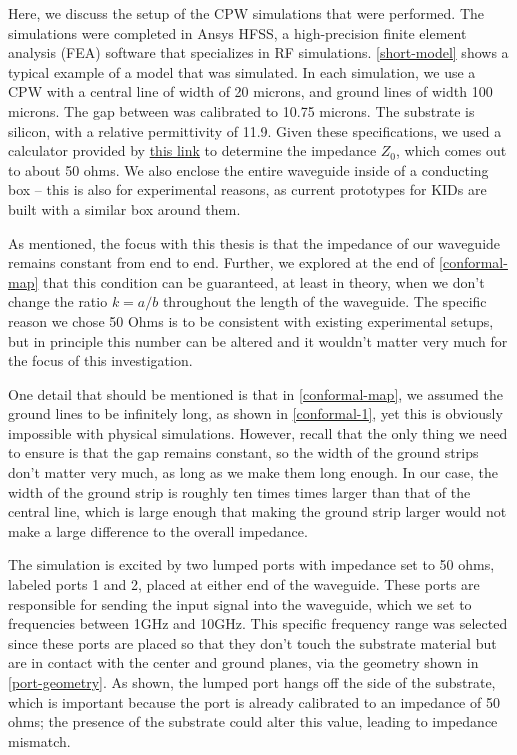Here, we discuss the setup of the CPW simulations that were performed. The simulations were completed in
Ansys HFSS, a high-precision finite element analysis (FEA) software that specializes in RF simulations.
\cref{short-model} shows a typical example of a model that was simulated. In each simulation, we
use a CPW with a central line of width of 20 microns, and ground lines of width 100 microns. The gap between
was calibrated to 10.75 microns. The substrate is silicon, with a relative permittivity of 11.9. 
Given these specifications, we used a calculator provided by 
\href{https://www.microwaves101.com/calculators/864-coplanar-waveguide-calculator}{this link} to determine
the impedance \( Z_0 \), which comes out to about 50 ohms. We also enclose the entire waveguide inside of a
conducting box -- this is also for experimental reasons, as current prototypes for KIDs are built with a
similar box around them. 

As mentioned, the focus with this thesis is that the impedance of our waveguide remains constant from end to
end. Further, we explored at the end of \cref{conformal-map} that this condition can be guaranteed, at least
in theory, when we don't change the ratio \( k = a / b \) throughout the length of the waveguide.
The specific reason we chose 50 Ohms is to be consistent with existing experimental setups,
but in principle this number can be altered and it wouldn't matter very much for the focus of this
investigation.   

One detail that should be mentioned is that in \cref{conformal-map}, we assumed the ground lines to be
infinitely long, as shown in \cref{conformal-1}, yet this is obviously impossible with physical simulations. However,
recall that the only thing we need to ensure is that the gap remains constant, so the width of the ground
strips don't matter very much, as long as we make them long enough. In our case, the width of the ground
strip is roughly ten times times larger than that of the central line, 
which is large enough that making the ground strip larger would not make a large difference to 
the overall impedance.    

The simulation is excited by two lumped ports with impedance set to 50 ohms, labeled ports 1 and 2, placed at
either end of the waveguide. These ports are responsible for sending the input signal into the waveguide,
which we set to frequencies between 1GHz and 10GHz. This specific frequency range was selected since 
these ports are placed so that they don't touch the substrate material but are
in contact with the center and ground planes, via the geometry shown in \cref{port-geometry}. As shown, the
lumped port hangs off the side of the substrate, which is important because the port is already calibrated to
an impedance of 50 ohms; the presence of the substrate could alter this value, leading to impedance mismatch.

